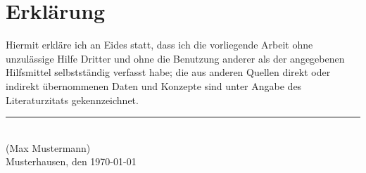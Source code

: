 
\cleardoublepage
\thispagestyle{plain}
\vspace*{\fill}

\section*{Erklärung}

Hiermit erkläre ich an Eides statt, dass ich die vorliegende
Arbeit ohne unzulässige Hilfe Dritter und ohne die Benutzung anderer
als der angegebenen Hilfsmittel selbstständig verfasst habe;
die aus anderen Quellen direkt oder indirekt übernommenen Daten und Konzepte sind unter Angabe des Literaturzitats gekennzeichnet.

\vskip2cm

\rule{5cm}{0.4pt}\\
(Max Mustermann)\\
Musterhausen, den \today